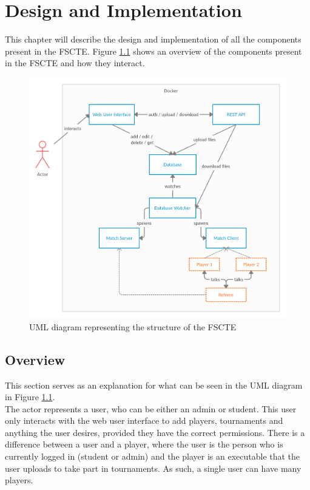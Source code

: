 \documentclass[a4paper, 11pt]{report}
\begin{document}
\chapter{Design and Implementation}
\label{chap:design}

This chapter will describe the design and implementation of all the components
present in the FSCTE. Figure \ref{fig:uml-structure} shows an overview of the
components present in the FSCTE and how they interact.
\begin{figure}[H]
	\centering
	\includegraphics[scale=0.25]{uml-structure.png}
	\caption{UML diagram representing the structure of the FSCTE}
	\label{fig:uml-structure}
\end{figure}

\section{Overview}
\label{sec:impl-overview}

This section serves as an explanation for what can be seen in the UML diagram in
Figure \ref{fig:uml-structure}. \\

The actor represents a user, who can be either an admin or student. This user
only interacts with the web user interface to add players, tournaments and anything
the user desires, provided they have the correct permissions. There is a
difference between a user and a player, where the user is the person who is
currently logged in (student or admin) and the player is an executable that the
user uploads to take part in tournaments. As such, a single user can have many
players. \\
\end{document}
